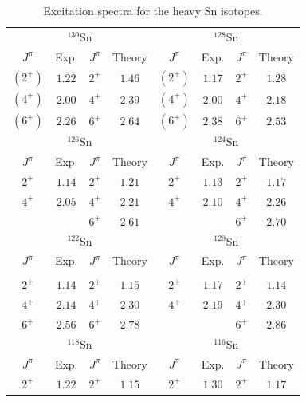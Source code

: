 \begin{table}%
\caption{Excitation spectra for the heavy Sn isotopes. \label{Morten:tab:2}}
\vspace{0.2cm}
\begin{center}
\renewcommand{\arraystretch}{1.2}
\begin{tabular}{|cccc|cccc|}
\hline
\multicolumn{4}{|c|}{$^{130}$Sn}&\multicolumn{4}{|c|}{$^{128}$Sn}\\
$J^{\pi}$&Exp.&$J^{\pi}$&Theory&$J^{\pi}$&Exp.&$J^{\pi}$&Theory\\
\hline
$(2^{+})$ & $1.22$ & $2^{+}$   & $1.46$ &$(2^{+})$ & $1.17$ & $2^{+}$ & $1.28$\\
$(4^{+})$ & $2.00$ & $4^{+}$   & $2.39$ &$(4^{+})$ & $2.00$ & $4^{+}$ & $2.18$\\
$(6^{+})$ & $2.26$ & $6^{+}$   & $2.64$ &$(6^{+})$ & $2.38$ & $6^{+}$ & $2.53$\\%
\hline %
\multicolumn{4}{|c|}{$^{126}$Sn}&\multicolumn{4}{|c|}{$^{124}$Sn}\\
$J^{\pi}$&Exp.&$J^{\pi}$&Theory&$J^{\pi}$&Exp.&$J^{\pi}$&Theory\\
\hline
$2^{+}$ & $1.14$ & $2^{+}$   & $1.21$ &$2^{+}$ & $1.13$ & $2^{+}$ & $1.17$\\
$4^{+}$ & $2.05$ & $4^{+}$   & $2.21$ &$4^{+}$ & $2.10$ & $4^{+}$ & $2.26$\\
$     $ &        & $6^{+}$   & $2.61$ &        &        & $6^{+}$ & $2.70$\\%
\hline %
\multicolumn{4}{|c|}{$^{122}$Sn}&\multicolumn{4}{|c|}{$^{120}$Sn}\\
$J^{\pi}$&Exp.&$J^{\pi}$&Theory&$J^{\pi}$&Exp.&$J^{\pi}$&Theory\\
\hline
&&&&&&&\\[-3pt]
$2^{+}$   & $1.14$ & $2^{+}$   & $1.15$ & $2^{+}$  & $1.17$ & $2^{+}$ & $1.14$\\
$4^{+}$   & $2.14$ & $4^{+}$   & $2.30$ & $4^{+}$  & $2.19$ & $4^{+}$ & $2.30$\\
$6^{+}$   & $2.56$ & $6^{+}$   & $2.78$ &          &        & $6^{+}$ & $2.86$\\%
\hline %
\multicolumn{4}{|c|}{$^{118}$Sn}&\multicolumn{4}{|c|}{$^{116}$Sn}\\
$J^{\pi}$&Exp.&$J^{\pi}$&Theory&$J^{\pi}$&Exp.&$J^{\pi}$&Theory\\
\hline
$2^{+}$   & $1.22$ & $2^{+}$   & $1.15$ & $2^{+}$  & $1.30$ & $2^{+}$ & $1.17$\\%
\hline
\end{tabular}
\end{center}
\end{table}

